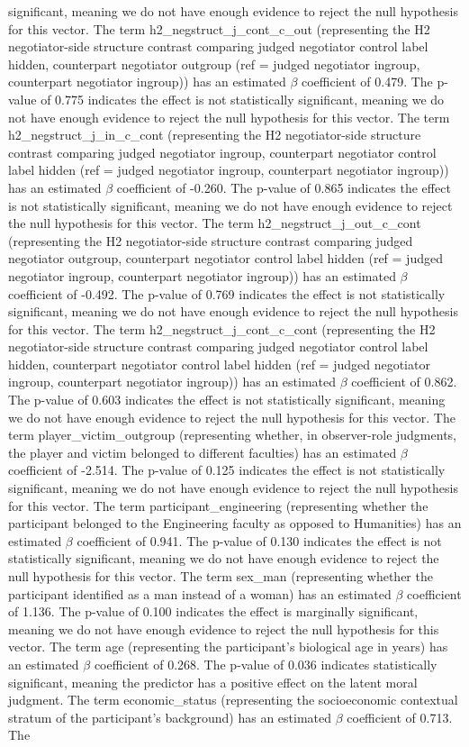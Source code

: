 \documentclass[11pt]{article}
\begin{document}
significant, meaning we do not have enough evidence to reject the null hypothesis for this vector. The term h2\_negstruct\_j\_cont\_c\_out (representing the H2 negotiator-side structure contrast comparing judged negotiator control label hidden, counterpart negotiator outgroup (ref = judged negotiator ingroup, counterpart negotiator ingroup)) has an estimated $\beta$ coefficient of 0.479. The p-value of 0.775 indicates the effect is not statistically significant, meaning we do not have enough evidence to reject the null hypothesis for this vector. The term h2\_negstruct\_j\_in\_c\_cont (representing the H2 negotiator-side structure contrast comparing judged negotiator ingroup, counterpart negotiator control label hidden (ref = judged negotiator ingroup, counterpart negotiator ingroup)) has an estimated $\beta$ coefficient of -0.260. The p-value of 0.865 indicates the effect is not statistically significant, meaning we do not have enough evidence to reject the null hypothesis for this vector. The term h2\_negstruct\_j\_out\_c\_cont (representing the H2 negotiator-side structure contrast comparing judged negotiator outgroup, counterpart negotiator control label hidden (ref = judged negotiator ingroup, counterpart negotiator ingroup)) has an estimated $\beta$ coefficient of -0.492. The p-value of 0.769 indicates the effect is not statistically significant, meaning we do not have enough evidence to reject the null hypothesis for this vector. The term h2\_negstruct\_j\_cont\_c\_cont (representing the H2 negotiator-side structure contrast comparing judged negotiator control label hidden, counterpart negotiator control label hidden (ref = judged negotiator ingroup, counterpart negotiator ingroup)) has an estimated $\beta$ coefficient of 0.862. The p-value of 0.603 indicates the effect is not statistically significant, meaning we do not have enough evidence to reject the null hypothesis for this vector. The term player\_victim\_outgroup (representing whether, in observer-role judgments, the player and victim belonged to different faculties) has an estimated $\beta$ coefficient of -2.514. The p-value of 0.125 indicates the effect is not statistically significant, meaning we do not have enough evidence to reject the null hypothesis for this vector. The term participant\_engineering (representing whether the participant belonged to the Engineering faculty as opposed to Humanities) has an estimated $\beta$ coefficient of 0.941. The p-value of 0.130 indicates the effect is not statistically significant, meaning we do not have enough evidence to reject the null hypothesis for this vector. The term sex\_man (representing whether the participant identified as a man instead of a woman) has an estimated $\beta$ coefficient of 1.136. The p-value of 0.100 indicates the effect is marginally significant, meaning we do not have enough evidence to reject the null hypothesis for this vector. The term age (representing the participant's biological age in years) has an estimated $\beta$ coefficient of 0.268. The p-value of 0.036 indicates statistically significant, meaning the predictor has a positive effect on the latent moral judgment. The term economic\_status (representing the socioeconomic contextual stratum of the participant's background) has an estimated $\beta$ coefficient of 0.713. The 
\end{document}

